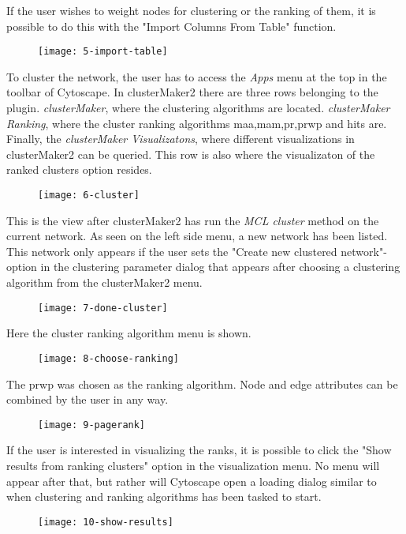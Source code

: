 If the user wishes to weight nodes for clustering or the ranking of them, it is
possible to do this with the "Import Columns From Table" function.
\begin{figure}[H]
    \label{fig:import-table}
    \texttt{[image: 5-import-table]}
\end{figure}

To cluster the network, the user has to access the \textit{Apps} menu at the top
in the toolbar of Cytoscape. In clusterMaker2 there are three rows belonging
to the plugin. \textit{clusterMaker}, where the clustering algorithms are
located. \textit{clusterMaker Ranking}, where the cluster ranking algorithms
\gls{maa},\gls{mam},\gls{pr},\gls{prwp} and \gls{hits} are. Finally, the
\textit{clusterMaker Visualizatons}, where different visualizations in
clusterMaker2 can be queried. This row is also where the visualizaton of the
ranked clusters option resides.
\begin{figure}[H]
    \label{fig:cluster}
    \texttt{[image: 6-cluster]}
\end{figure}

This is the view after clusterMaker2 has run the \textit{MCL cluster} method on
the current network. As seen on the left side menu, a new network has been
listed. This network only appears if the user sets the "Create new clustered
network"-option in the clustering parameter dialog that appears after choosing a
clustering algorithm from the clusterMaker2 menu.
\begin{figure}[H]
    \texttt{[image: 7-done-cluster]}
    \label{fig:done-cluster}
\end{figure}

Here the cluster ranking algorithm menu is shown.
\begin{figure}[H]
    \label{fig:choose-ranking}
    \texttt{[image: 8-choose-ranking]}
\end{figure}

The \gls{prwp} was chosen as the ranking algorithm. Node and edge attributes can
be combined by the user in any way. 
\begin{figure}[H]
    \label{fig:pagerank}
    \texttt{[image: 9-pagerank]}
\end{figure}

If the user is interested in visualizing the ranks, it is possible to click the
"Show results from ranking clusters" option in the visualization menu. No menu
will appear after that, but rather will Cytoscape open a loading dialog similar
to when clustering and ranking algorithms has been tasked to start.
\begin{figure}[H]
    \label{fig:show-results}
    \texttt{[image: 10-show-results]}
\end{figure}

